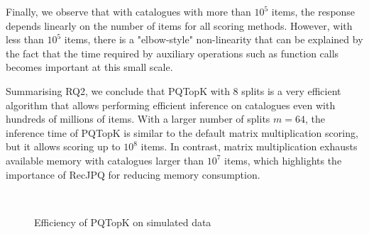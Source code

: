 \documentclass[sigconf,natbib=true, review=False]{acmart} %
\newcommand{\gsasha}[1]{\textcolor[HTML]{000000}{#1}}
\begin{document}
 \gsasha{Finally, we observe that with catalogues with more than  $10^5$ items, the response depends linearly on the number of items for all scoring methods}. \gsasha{However, with less than $10^5$ items, there is a }  "elbow-style" non-linearity \gsasha{that} can be explained \gsasha{by the fact that the time required} by auxiliary operations such as function calls becomes important at this small scale. 

 \gsasha{Summarising} RQ2, we \gsasha{conclude} that PQTopK with 8 splits is a very efficient algorithm that allows performing efficient inference on catalogues even with hundreds of millions of items. With a larger number of splits $m=64$, the inference time of PQTopK is similar to the default matrix multiplication scoring, but it allows scoring up to $10^8$ items. In contrast, matrix multiplication \gsasha{exhausts available memory} with catalogues larger than  $10^7$ items, \gsasha{which highlights the importance of RecJPQ for reducing memory consumption}. 

\begin{figure}
    \vspace{-1\baselineskip}
    \centering
        \\
    \vspace{-0.8\baselineskip    }
    \caption{Efficiency of PQTopK on simulated data}
    \label{fig:simulate_effectiveness}
\end{figure}
\end{document}
